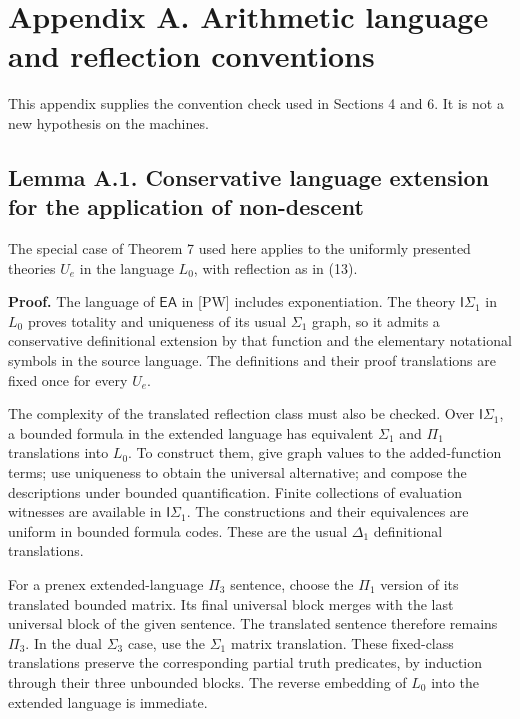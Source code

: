 \documentclass[
  11pt,
  letterpaper,
]{article}
\begin{document}
\section{Appendix A. Arithmetic language and reflection
conventions}\label{appendix-a.-arithmetic-language-and-reflection-conventions}

This appendix supplies the convention check used in Sections 4 and 6. It
is not a new hypothesis on the machines.

\subsection{Lemma A.1. Conservative language extension for the
application of
non-descent}\label{lemma-a.1.-conservative-language-extension-for-the-application-of-non-descent}

The special case of Theorem 7 used here applies to the uniformly
presented theories \(U_e\) in the language \(L_0\), with reflection as
in (13).

\textbf{Proof.} The language of \(\mathsf{EA}\) in {[}PW{]} includes
exponentiation. The theory \(\mathsf I\Sigma_1\) in \(L_0\) proves
totality and uniqueness of its usual \(\Sigma_1\) graph, so it admits a
conservative definitional extension by that function and the elementary
notational symbols in the source language. The definitions and their
proof translations are fixed once for every \(U_e\).

The complexity of the translated reflection class must also be checked.
Over \(\mathsf I\Sigma_1\), a bounded formula in the extended language
has equivalent \(\Sigma_1\) and \(\Pi_1\) translations into \(L_0\). To
construct them, give graph values to the added-function terms; use
uniqueness to obtain the universal alternative; and compose the
descriptions under bounded quantification. Finite collections of
evaluation witnesses are available in \(\mathsf I\Sigma_1\). The
constructions and their equivalences are uniform in bounded formula
codes. These are the usual \(\Delta_1\) definitional translations.

For a prenex extended-language \(\Pi_3\) sentence, choose the \(\Pi_1\)
version of its translated bounded matrix. Its final universal block
merges with the last universal block of the given sentence. The
translated sentence therefore remains \(\Pi_3\). In the dual
\(\Sigma_3\) case, use the \(\Sigma_1\) matrix translation. These
fixed-class translations preserve the corresponding partial truth
predicates, by induction through their three unbounded blocks. The
reverse embedding of \(L_0\) into the extended language is immediate.
\end{document}
